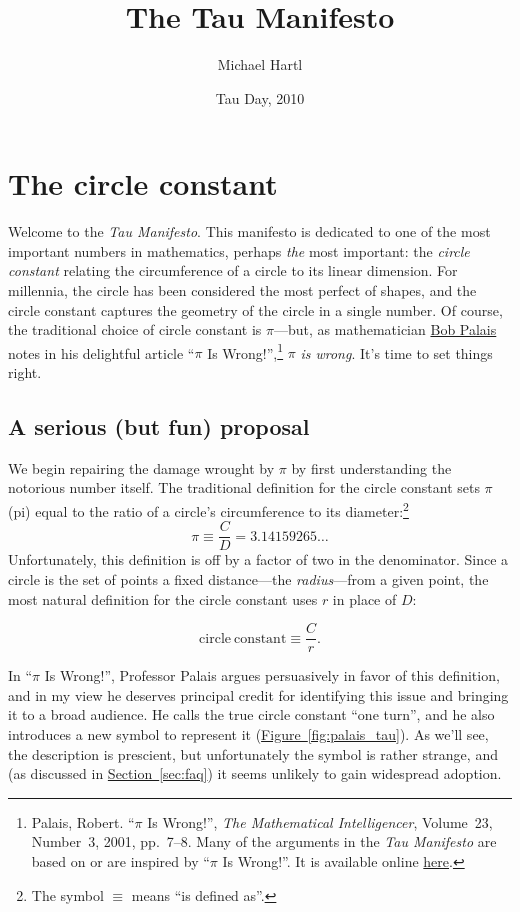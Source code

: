 \documentclass{article}
\begin{document}
\title{The Tau Manifesto}
\author{Michael Hartl}
\date{Tau Day, 2010}
\maketitle

\section{The circle constant} %
\label{sec:the_circle_constant}

Welcome to the \emph{Tau Manifesto}. This manifesto is dedicated to one of the most important numbers in mathematics, perhaps \emph{the} most important: the \emph{circle constant} relating the circumference of a circle to its linear dimension. For millennia, the circle has been considered the most perfect of shapes, and the circle constant captures the geometry of the circle in a single number. Of course, the traditional choice of circle constant is $\pi$---but, as mathematician \href{http://www.math.utah.edu/~palais/}{Bob Palais} notes in his delightful article ``$\pi$ Is Wrong!'',\footnote{Palais, Robert. ``$\pi$ Is Wrong!'', \emph{The Mathematical Intelligencer}, Volume~23, Number~3, 2001, pp.~7--8. Many of the arguments in the \emph{Tau Manifesto} are based on or are inspired by ``$\pi$ Is Wrong!''. It is available online \href{http://www.math.utah.edu/~palais/pi.html}{here}.} $\pi$ \emph{is wrong}. It's time to set things right.

  \subsection{A serious (but fun) proposal} %
  \label{sec:a_serious_but_fun_proposal}

We begin repairing the damage wrought by $\pi$ by first understanding the notorious number itself. The traditional definition for the circle constant sets $\pi$ (pi) equal to the ratio of a circle's circumference to its diameter:\footnote{The symbol $\equiv$ means ``is defined as''.}
\[
  \pi \equiv \frac{C}{D} = 3.14159265\ldots
\]
Unfortunately, this definition is off by a factor of two in the denominator. Since a circle is the set of points a fixed distance---the \emph{radius}---from a given point, the most natural definition for the circle constant uses $r$ in place of $D$:

\[
  \mathrm{circle\ constant} \equiv \frac{C}{r}.
\]

In ``$\pi$ Is Wrong!'', Professor Palais argues persuasively in favor of this definition, and in my view he deserves principal credit for identifying this issue and bringing it to a broad audience. He calls the true circle constant ``one turn'', and he also introduces a new symbol to represent it (\hyperref[fig:palais_tau]{Figure~}\ref{fig:palais_tau}). As we'll see, the description is prescient, but unfortunately the symbol is rather strange, and (as discussed in \hyperref[sec:faq]{Section~}\ref{sec:faq}) it seems unlikely to gain widespread adoption.
\end{document}
